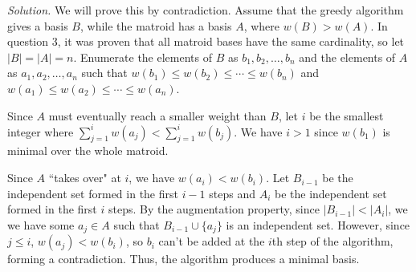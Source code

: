 \documentclass[11pt,letterpaper]{article}
\newenvironment{solution}{\color{blue}\textit{Solution.}}{\color{black}}
\begin{document}
\begin{enumerate}
\begin{solution}
        We will prove this by contradiction. Assume that the greedy algorithm gives a basis $B$, while the matroid has a basis $A$, where $w(B)>w(A)$. In question 3, it was proven that all matroid bases have the same cardinality, so let $|B|=|A|=n$. Enumerate the elements of $B$ as $b_1,b_2,\dots{},b_n$ and the elements of $A$ as $a_1,a_2,\dots{},a_n$ such that $w(b_1)\leq{w(b_2)}\leq\cdots\leq{w(b_n)}$ and $w(a_1)\leq{w(a_2)}\leq\cdots\leq{w(a_n)}$.

        Since $A$ must eventually reach a smaller weight than $B$, let $i$ be the smallest integer where $\sum_{j=1}^{i}{w(a_j)}<\sum_{j=1}^{i}{w(b_j)}$. We have $i>1$ since $w(b_1)$ is minimal over the whole matroid.

        Since $A$ ``takes over" at $i$, we have $w(a_i)<w(b_i)$. Let $B_{i-1}$ be the independent set formed in the first $i-1$ steps and $A_i$ be the independent set formed in the first $i$ steps. By the augmentation property, since $|B_{i-1}|<|A_i|$, we we have some $a_j\in{A}$ such that $B_{i-1}\cup\{a_j\}$ is an independent set. However, since $j\leq{i}$, $w(a_j)<w(b_i)$, so $b_i$ can't be added at the $i$th step of the algorithm, forming a contradiction. Thus, the algorithm produces a minimal basis.
    \end{solution}

\end{enumerate}    
\end{document}

